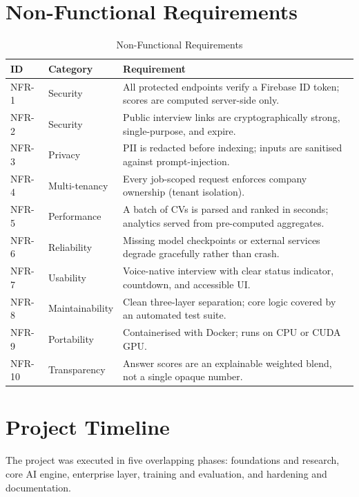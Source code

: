 \documentclass[12pt,a4paper,oneside]{report}
\begin{document}
\section{Non-Functional Requirements}

\begin{table}[H]
\centering
\caption{Non-Functional Requirements}
\label{tab:nfr}
\begin{tabularx}{\textwidth}{C{1.2cm}C{2.5cm}X}
\toprule
\textbf{ID} & \textbf{Category} & \textbf{Requirement} \\
\midrule
NFR-1  & Security        & All protected endpoints verify a Firebase ID token; scores are computed server-side only. \\
NFR-2  & Security        & Public interview links are cryptographically strong, single-purpose, and expire. \\
NFR-3  & Privacy         & PII is redacted before indexing; inputs are sanitised against prompt-injection. \\
NFR-4  & Multi-tenancy   & Every job-scoped request enforces company ownership (tenant isolation). \\
NFR-5  & Performance     & A batch of CVs is parsed and ranked in seconds; analytics served from pre-computed aggregates. \\
NFR-6  & Reliability     & Missing model checkpoints or external services degrade gracefully rather than crash. \\
NFR-7  & Usability       & Voice-native interview with clear status indicator, countdown, and accessible UI. \\
NFR-8  & Maintainability & Clean three-layer separation; core logic covered by an automated test suite. \\
NFR-9  & Portability     & Containerised with Docker; runs on CPU or CUDA GPU. \\
NFR-10 & Transparency    & Answer scores are an explainable weighted blend, not a single opaque number. \\
\bottomrule
\end{tabularx}
\end{table}

\section{Project Timeline}

The project was executed in five overlapping phases: foundations and research, core AI engine,
enterprise layer, training and evaluation, and hardening and documentation.
\end{document}
